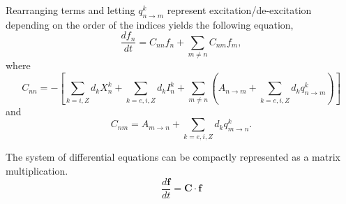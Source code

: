 Rearranging terms and letting $q^k_{n \rightarrow m}$ represent excitation/de-excitation depending on the order of the indices yields the following equation,
\begin{equation}
    \frac{df_n}{dt} = C_{nn} f_n + \sum_{m \ne n} C_{nm} f_m,
\end{equation}
where
\begin{equation}
    C_{nn} = - \left [ \sum_{k=i,Z} d_k X^k_n + \sum_{k=e,i,Z} d_k I^k_n + \sum_{m \ne n} \left ( A_{n \rightarrow m} + \sum_{k=e,i,Z} d_k q^k_{n \rightarrow m} \right ) \right ]
\end{equation}
and 
\begin{equation}
    C_{nm} = A_{m \rightarrow n} + \sum_{k=e,i,Z} d_k q^k_{m \rightarrow n}.
\end{equation}

The system of differential equations can be compactly represented as a matrix multiplication.
\begin{equation}\label{eq:el_diffeq}
    \frac{d \mathbf{f}}{dt} = \mathbf{C} \cdot \mathbf{f}
\end{equation}